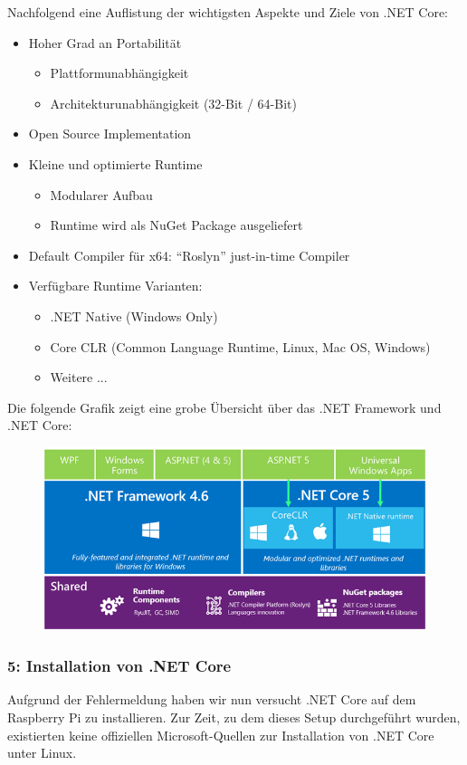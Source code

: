 Nachfolgend eine Auflistung der wichtigsten Aspekte und Ziele von .NET Core:
\begin{itemize}
\item Hoher Grad an Portabilität
\begin{itemize}
\item Plattformunabhängigkeit
\item Architekturunabhängigkeit (32-Bit / 64-Bit)
\end{itemize}
\item Open Source Implementation
\item Kleine und optimierte Runtime
\begin{itemize}
\item Modularer Aufbau
\item Runtime wird als NuGet Package ausgeliefert
\end{itemize}
\item Default Compiler für x64: "`Roslyn"' just-in-time Compiler
\item Verfügbare Runtime Varianten: 
\begin{itemize}
\item .NET Native (Windows Only)
\item Core CLR (Common Language Runtime, Linux, Mac OS, Windows)
\item Weitere ...
\end{itemize}
\end{itemize}

Die folgende Grafik zeigt eine grobe Übersicht über das .NET Framework und .NET Core:
\begin{figure}[H]
  \centering
  \includegraphics[width=15cm]{./images/UnderstandingNetCore}
\end{figure}


\subsubsection{5: Installation von .NET Core}
Aufgrund der Fehlermeldung haben wir nun versucht .NET Core auf dem Raspberry Pi zu installieren. Zur Zeit, zu dem dieses Setup durchgeführt wurden, existierten keine offiziellen Microsoft-Quellen zur Installation von .NET Core unter Linux.


